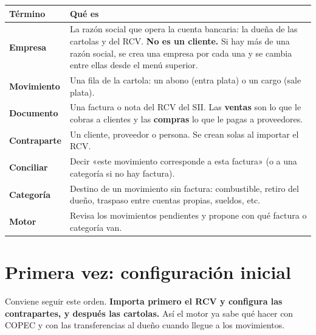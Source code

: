 \documentclass[11pt,a4paper]{article}
\newcommand{\encabezado}[1]{\sffamily\bfseries #1}
\begin{document}
\begin{tabularx}{\textwidth}{@{}>{\sffamily\bfseries}p{3cm}Y@{}}
\toprule
{}\encabezado{Término} & \encabezado{Qué es}\\
\midrule
Empresa & La razón social que opera la cuenta bancaria: la dueña de las cartolas y del RCV. \textbf{No es un cliente.} Si hay más de una razón social, se crea una empresa por cada una y se cambia entre ellas desde el menú superior.\\
Movimiento & Una fila de la cartola: un abono (entra plata) o un cargo (sale plata).\\
Documento & Una factura o nota del RCV del SII. Las \textbf{ventas} son lo que le cobras a clientes y las \textbf{compras} lo que le pagas a proveedores.\\
Contraparte & Un cliente, proveedor o persona. Se crean solas al importar el RCV.\\
Conciliar & Decir «este movimiento corresponde a esta factura» (o a una categoría si no hay factura).\\
Categoría & Destino de un movimiento sin factura: combustible, retiro del dueño, traspaso entre cuentas propias, sueldos, etc.\\
Motor & Revisa los movimientos pendientes y propone con qué factura o categoría van.\\
\bottomrule
\end{tabularx}

\section{Primera vez: configuración inicial}

Conviene seguir este orden. \textbf{Importa primero el RCV y configura las contrapartes, y después las cartolas.} Así el motor ya sabe qué hacer con COPEC y con las transferencias al dueño cuando llegue a los movimientos.
\end{document}

